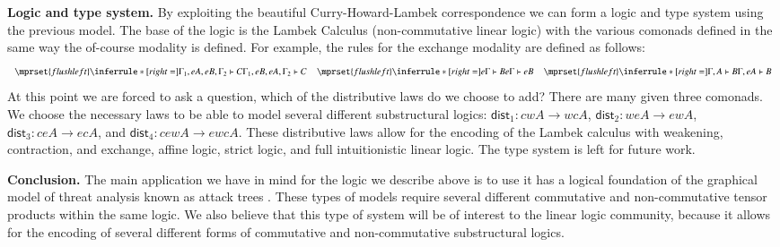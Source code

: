 \documentclass{article}
\let\mto\to
\let\to\relax
\newcommand{\to}{\rightarrow}
\begin{document}
\textbf{Logic and type system.} By exploiting the beautiful
Curry-Howard-Lambek correspondence we can form a logic and type system
using the previous model.  The base of the logic is the Lambek
Calculus (non-commutative linear logic) with the various comonads
defined in the same way the of-course modality is defined.  For
example, the rules for the exchange modality are defined as follows:
\vspace{-7px}
\[
\small
\begin{array}{cccccccccccccc}
  $$\mprset{flushleft}
  \inferrule* [right=] {
    \Gamma_1,eA,eB,\Gamma_2 \vdash C
  }{\Gamma_1,eB,eA,\Gamma_2 \vdash C}
  &
  $$\mprset{flushleft}
  \inferrule* [right=] {
    e\Gamma \vdash B
  }{e\Gamma \vdash eB}
  &
  $$\mprset{flushleft}
  \inferrule* [right=] {
    \Gamma,A \vdash B
  }{\Gamma,eA \vdash B}
\end{array}
\vspace{-7px}
\]
At this point we are forced to ask a question, which of the
distributive laws do we choose to add?  There are many given three
comonads.  We choose the necessary laws to be able to model several
different substructural logics: $\mathsf{dist}_1 : cwA \mto wcA$,
$\mathsf{dist}_2 : weA \mto ewA$, $\mathsf{dist}_3 : ceA \mto ecA$,
and $\mathsf{dist}_4 : cewA \mto ewcA$.  These distributive laws allow
for the encoding of the Lambek calculus with weakening, contraction,
and exchange, affine logic, strict logic, and full intuitionistic
linear logic.  The type system is left for future work.

\textbf{Conclusion.}  The main application we have in mind for the
logic we describe above is to use it has a logical foundation of the
graphical model of threat analysis known as attack trees
\cite{Eades:2016a}.  These types of models require several different
commutative and non-commutative tensor products within the same logic.
We also believe that this type of system will be of interest to the
linear logic community, because it allows for the encoding of
several different forms of commutative and non-commutative
substructural logics.

\vspace{-15px}
 
\end{document}
